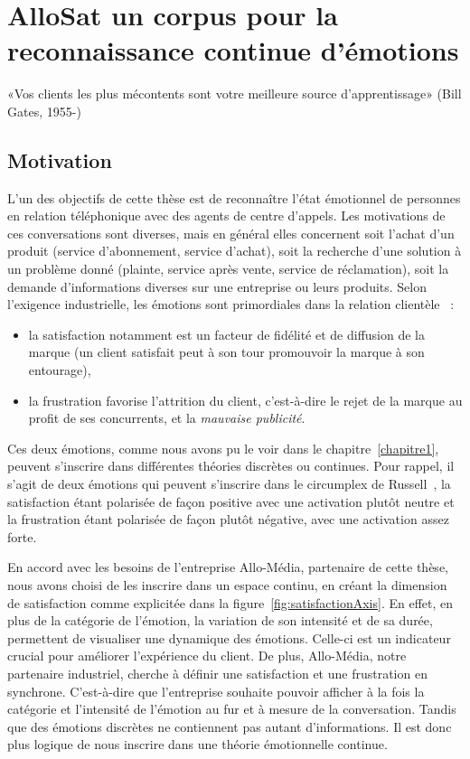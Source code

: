 \chapter{AlloSat un corpus pour la reconnaissance continue d'émotions}
\label{chapitre4}
«Vos clients les plus mécontents sont votre meilleure source d’apprentissage»  (Bill Gates, 1955-)

\section{Motivation}
L'un des objectifs de cette thèse est de reconnaître l'état émotionnel de personnes en relation téléphonique avec des agents de centre d'appels. Les motivations de ces conversations sont diverses, mais en général elles concernent soit l'achat d'un produit (service d'abonnement, service d'achat), soit la recherche d'une solution à un problème donné (plainte, service après vente, service de réclamation), soit la demande d'informations diverses sur une entreprise ou leurs produits. Selon l'exigence industrielle, les émotions sont primordiales dans la relation clientèle~\cite{Tumbat2011} :
\begin{itemize}
  \item la satisfaction notamment est un facteur de fidélité et de diffusion de la marque (un client satisfait peut à son tour promouvoir la marque à son entourage),
  \item la frustration favorise l'attrition du client, c'est-à-dire le rejet de la marque au profit de ses concurrents, et la \textit{mauvaise publicité}.
\end{itemize}
Ces deux émotions, comme nous avons pu le voir dans le chapitre~\ref{chapitre1}, peuvent s'inscrire dans différentes théories discrètes ou continues. Pour rappel, il s'agit de deux émotions qui peuvent s'inscrire dans le circumplex de Russell~\cite{Russell1980}, la satisfaction étant polarisée de façon positive avec une activation plutôt neutre et la frustration étant polarisée de façon plutôt négative, avec une activation assez forte.

En accord avec les besoins de l'entreprise Allo-Média, partenaire de cette thèse, nous avons choisi de les inscrire dans un espace continu, en créant la dimension de satisfaction comme explicitée dans la figure~\ref{fig:satisfactionAxis}. En effet, en plus de la catégorie de l'émotion, la variation de son intensité et de sa durée, permettent de visualiser une dynamique des émotions. Celle-ci est un indicateur crucial pour améliorer l'expérience du client. De plus, Allo-Média, notre partenaire industriel, cherche à définir une satisfaction et une frustration en synchrone. C'est-à-dire que l'entreprise souhaite pouvoir afficher à la fois la catégorie et l'intensité de l'émotion au fur et à mesure de la conversation. Tandis que des émotions discrètes ne contiennent pas autant d'informations. Il est donc plus logique de nous inscrire dans une théorie émotionnelle continue.

